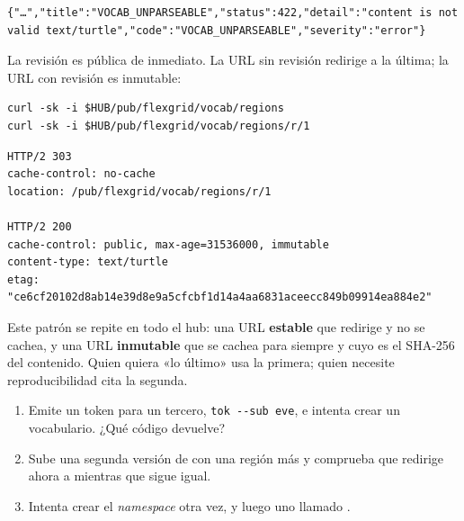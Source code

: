 \begin{lstlisting}[style=out]
{"…","title":"VOCAB_UNPARSEABLE","status":422,"detail":"content is not valid text/turtle","code":"VOCAB_UNPARSEABLE","severity":"error"}
\end{lstlisting}

La revisión es pública de inmediato. La URL sin revisión redirige a la última; la URL con revisión es inmutable:

\begin{lstlisting}[style=sh]
curl -sk -i $HUB/pub/flexgrid/vocab/regions
curl -sk -i $HUB/pub/flexgrid/vocab/regions/r/1
\end{lstlisting}
\begin{lstlisting}[style=out]
HTTP/2 303
cache-control: no-cache
location: /pub/flexgrid/vocab/regions/r/1

HTTP/2 200
cache-control: public, max-age=31536000, immutable
content-type: text/turtle
etag: "ce6cf20102d8ab14e39d8e9a5cfcbf1d14a4aa6831aceecc849b09914ea884e2"
\end{lstlisting}

\begin{ideaClave}
Este patrón se repite en todo el hub: una URL \textbf{estable} que redirige y no se cachea, y una URL
\textbf{inmutable} que se cachea para siempre y cuyo  es el SHA-256 del contenido. Quien quiera «lo
último» usa la primera; quien necesite reproducibilidad cita la segunda.
\end{ideaClave}

\begin{retos}
\begin{enumerate}[leftmargin=*, itemsep=2pt]
  \item Emite un token para un tercero, \texttt{tok -{}-sub eve}, e intenta crear un vocabulario. ¿Qué código devuelve?
  \item Sube una segunda versión de  con una región más y comprueba que
         redirige ahora a  mientras que  sigue igual.
  \item Intenta crear el \emph{namespace}  otra vez, y luego uno llamado .
\end{enumerate}
\end{retos}
